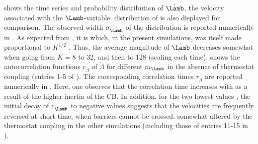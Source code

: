 %
 shows the time series and probability distribution of $\dot{\Lamb}$, the velocity associated with the $\Lamb$-variable.
 distribution of  is also displayed for comparison.
The observed width $\sigma_{\dot{\Lamb}}$ of the distribution is reported numerically in . 
As expected from , it is   which, 
in the present simulations, was itself made proportional to $K^{1/2}$ . Thus, the average magnitude of $\dot{\Lamb}$ decreases somewhat when going from $K=8$ to 32, and then to 128 (scaling  each time).
 shows the  autocorrelation functions $c_{\dot{\Lambda}}$ of $\dot{\Lambda}$ for different $m_{\Lamb}$ in the absence of thermostat coupling (entries 1-5 of ). 
The corresponding correlation times $\tau_{\dot{\Lambda}}$ are reported numerically in . Here, one observes that the correlation time 
increases with  as a result of the higher inertia of the CB.
In addition, for the two lowest values , the initial decay of $c_{\dot{\Lamb}}$ to negative values suggests that the velocities are frequently reversed at short time, when barriers cannot be crossed.
 somewhat altered by the thermostat coupling in the other simulations (including those of entries 11-15 in ).
%
